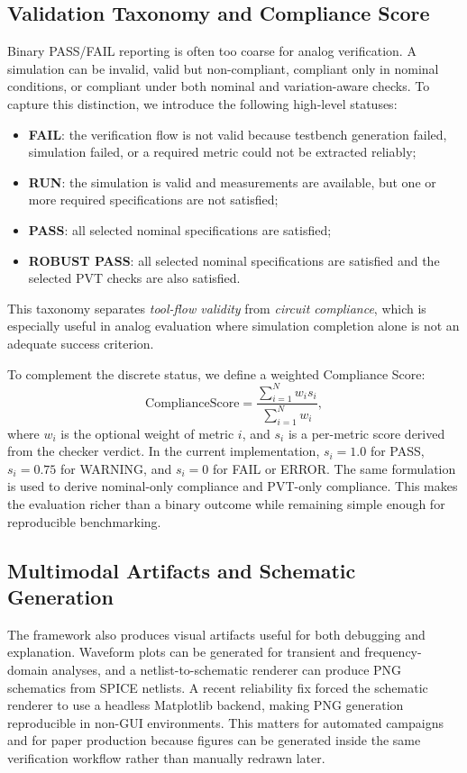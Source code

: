 \documentclass[conference]{IEEEtran}
\begin{document}
\subsection{Validation Taxonomy and Compliance Score}
Binary PASS/FAIL reporting is often too coarse for analog verification. A simulation can be invalid, valid but non-compliant, compliant only in nominal conditions, or compliant under both nominal and variation-aware checks. To capture this distinction, we introduce the following high-level statuses:

\begin{itemize}
\item \textbf{FAIL}: the verification flow is not valid because testbench generation failed, simulation failed, or a required metric could not be extracted reliably;
\item \textbf{RUN}: the simulation is valid and measurements are available, but one or more required specifications are not satisfied;
\item \textbf{PASS}: all selected nominal specifications are satisfied;
\item \textbf{ROBUST PASS}: all selected nominal specifications are satisfied and the selected PVT checks are also satisfied.
\end{itemize}

This taxonomy separates \emph{tool-flow validity} from \emph{circuit compliance}, which is especially useful in analog evaluation where simulation completion alone is not an adequate success criterion.

To complement the discrete status, we define a weighted Compliance Score:
\begin{equation}
\mathrm{ComplianceScore}=\frac{\sum_{i=1}^{N} w_i s_i}{\sum_{i=1}^{N} w_i},
\end{equation}
where $w_i$ is the optional weight of metric $i$, and $s_i$ is a per-metric score derived from the checker verdict. In the current implementation, $s_i=1.0$ for PASS, $s_i=0.75$ for WARNING, and $s_i=0$ for FAIL or ERROR. The same formulation is used to derive nominal-only compliance and PVT-only compliance. This makes the evaluation richer than a binary outcome while remaining simple enough for reproducible benchmarking.

\subsection{Multimodal Artifacts and Schematic Generation}
The framework also produces visual artifacts useful for both debugging and explanation. Waveform plots can be generated for transient and frequency-domain analyses, and a netlist-to-schematic renderer can produce PNG schematics from SPICE netlists. A recent reliability fix forced the schematic renderer to use a headless Matplotlib backend, making PNG generation reproducible in non-GUI environments. This matters for automated campaigns and for paper production because figures can be generated inside the same verification workflow rather than manually redrawn later.
\end{document}
